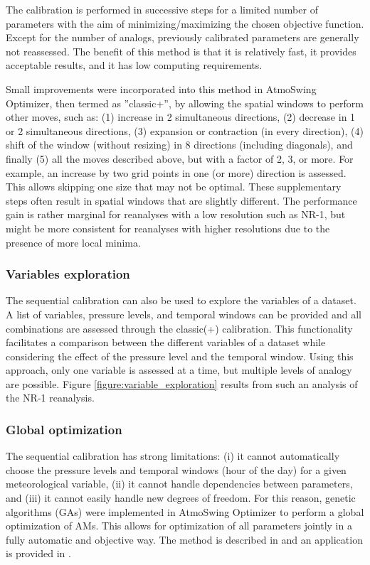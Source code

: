 \documentclass[gmdd]{copernicus}
\begin{document}
The calibration is performed in successive steps for a limited number of parameters with the aim of minimizing/maximizing the chosen objective function. Except for the number of analogs, previously calibrated parameters are generally not reassessed. The benefit of this method is that it is relatively fast, it provides acceptable results, and it has low computing requirements. 

Small improvements were incorporated into this method in AtmoSwing Optimizer, then termed as ''classic+'', by allowing the spatial windows to perform other moves, such as: (1) increase in 2 simultaneous directions, (2) decrease in 1 or 2 simultaneous directions, (3) expansion or contraction (in every direction), (4) shift of the window (without resizing) in 8 directions (including diagonals), and finally (5) all the moves described above, but with a factor of 2, 3, or more. For example, an increase by two grid points in one (or more) direction is assessed. This allows skipping one size that may not be optimal. These supplementary steps often result in spatial windows that are slightly different. The performance gain is rather marginal for reanalyses with a low resolution such as NR-1, but might be more consistent for reanalyses with higher resolutions due to the presence of more local minima.


\subsubsection{Variables exploration}
\label{sec:vars-explo}

The sequential calibration can also be used to explore the variables of a dataset. A list of variables, pressure levels, and temporal windows can be provided and all combinations are assessed through the classic(+) calibration. This functionality facilitates a comparison between the different variables of a dataset while considering the effect of the pressure level and the temporal window. Using this approach, only one variable is assessed at a time, but multiple levels of analogy are possible. Figure \ref{figure:variable_exploration} results from such an analysis of the NR-1 reanalysis. 


\subsubsection{Global optimization}
\label{sec:global-optimization}

The sequential calibration has strong limitations: (i) it cannot automatically choose the pressure levels and temporal windows (hour of the day) for a given meteorological variable, (ii) it cannot handle dependencies between parameters, and (iii) it cannot easily handle new degrees of freedom. For this reason, genetic algorithms (GAs) were implemented in AtmoSwing Optimizer to perform a global optimization of AMs. This allows for optimization of all parameters jointly in a fully automatic and objective way. The method is described in \citet{Horton2017a} and an application is provided in \citet{Horton2018a}.
\end{document}
